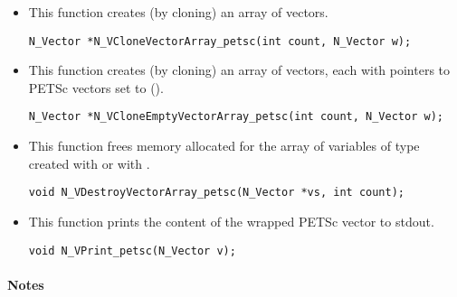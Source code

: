 \begin{itemize}
\item {}
 
  This function creates (by cloning) an array of  {\nvecpetsc} vectors.
 
\begin{verbatim}
N_Vector *N_VCloneVectorArray_petsc(int count, N_Vector w);
\end{verbatim}


\item {}
 
  This function creates (by cloning) an array of  {\nvecpetsc} vectors,
  each with pointers to PETSc vectors set to ().
 
\begin{verbatim}
N_Vector *N_VCloneEmptyVectorArray_petsc(int count, N_Vector w);
\end{verbatim}


\item {}
 
 This function frees memory allocated for the array of  variables of
 type  created with  or with
 .
 

 \verb|void N_VDestroyVectorArray_petsc(N_Vector *vs, int count);|



\item {}
  
  This function prints the content of the wrapped PETSc vector to stdout.
 
    
  \verb|void N_VPrint_petsc(N_Vector v);|


\end{itemize}
\paragraph{\bf Notes} 
           

